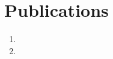 \documentclass[margin, 10pt]{res} %
\begin{document}
 

\section{Publications}
\begin{enumerate}
    \item {}
    \item {}
\end{enumerate}
\end{document}
